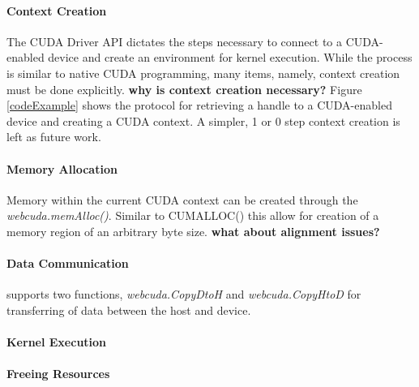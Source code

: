 \paragraph{Context Creation} The CUDA Driver API dictates the steps necessary to connect to a CUDA-enabled
device and create an environment for kernel execution. While the process is
similar to native CUDA programming, many items, namely, context creation must be
done explicitly. {\bf why is context creation necessary?}
Figure \ref{codeExample} shows the protocol for retrieving a handle to a
CUDA-enabled device and creating a CUDA context. A simpler, 1 or 0 step context
creation is left as future work.

\paragraph{Memory Allocation} Memory within the current CUDA context can be
created through the \textit{webcuda.memAlloc()}. Similar to CUMALLOC() this
allow for creation of a memory region of an arbitrary byte size. {\bf what about %
alignment issues?}

\paragraph{Data Communication} \name supports two functions,
\textit{webcuda.CopyDtoH} and \textit{webcuda.CopyHtoD} for transferring of data
between the host and device.

\paragraph{Kernel Execution}

\paragraph{Freeing Resources}

